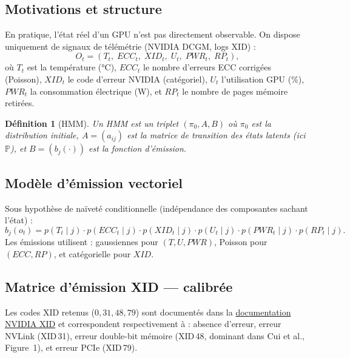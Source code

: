 \documentclass[12pt,a4paper]{article}
\newtheorem{definition}{Définition}
\begin{document}
\subsection{Motivations et structure}

En pratique, l'état réel d'un GPU n'est pas directement observable.
On dispose uniquement de signaux de télémétrie (NVIDIA DCGM, logs XID) :
\[
O_t = (T_t,\; ECC_t,\; XID_t,\; U_t,\; PWR_t,\; RP_t),
\]
où $T_t$ est la température (°C), $ECC_t$ le nombre d'erreurs ECC corrigées (Poisson),
$XID_t$ le code d'erreur NVIDIA (catégoriel), $U_t$ l'utilisation GPU (\%),
$PWR_t$ la consommation électrique (W), et $RP_t$ le nombre de pages mémoire retirées.

\begin{definition}[HMM]
Un HMM est un triplet $(\pi_0, A, B)$ où $\pi_0$ est la distribution initiale,
$A = (a_{ij})$ est la matrice de transition des états latents (ici $\mathbb{P}$),
et $B = (b_j(\cdot))$ est la fonction d'émission.
\end{definition}

\subsection{Modèle d'émission vectoriel}

Sous hypothèse de naïveté conditionnelle (indépendance des composantes sachant l'état) :
\[
b_j(o_t) = p(T_t\mid j)\cdot p(ECC_t\mid j)\cdot p(XID_t\mid j)
          \cdot p(U_t\mid j)\cdot p(PWR_t\mid j)\cdot p(RP_t\mid j).
\]
Les émissions utilisent : gaussiennes pour $(T,U,PWR)$, Poisson pour $(ECC,RP)$,
et catégorielle pour $XID$.

\subsection{Matrice d'émission XID --- calibrée}

Les codes XID retenus ($0, 31, 48, 79$) sont documentés dans la
\href{https://docs.nvidia.com/deploy/pdf/XID_Errors.pdf}{documentation NVIDIA XID}
et correspondent respectivement à : absence d'erreur, erreur NVLink (XID\,31),
erreur double-bit mémoire (XID\,48, dominant dans Cui et al., Figure~1),
et erreur PCIe (XID\,79).
\end{document}

